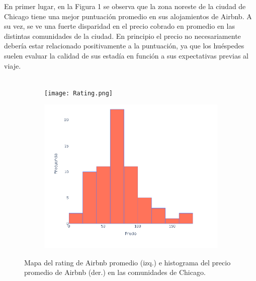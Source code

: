 \documentclass[10.5pt]{article}   %
\begin{document}
En primer lugar, en la Figura 1 se observa que la zona noreste de la ciudad de Chicago tiene una mejor puntuación promedio en sus alojamientos de Airbnb. A su vez, se ve una fuerte disparidad en el precio cobrado en promedio en las distintas comunidades de la ciudad. En principio el precio no necesariamente debería estar relacionado positivamente a la puntuación, ya que los huéspedes suelen evaluar la calidad de sus estadía en función a sus expectativas previas al viaje. \\\

\begin{figure}[H]
\centering
\begin{subfigure}{.5\textwidth}
    \centering
     \textbf{}\par\medskip
    \texttt{[image: Rating.png]}
    \label{fig2}
\end{subfigure}%
\begin{subfigure}{0.65\textwidth}
    \centering
     \textbf{}\par\medskip
    \includegraphics[scale=0.6]{Price.png}
    \label{fig2}
\end{subfigure}%
\caption{Mapa del rating de Airbnb promedio (izq.) e histograma del precio promedio de Airbnb (der.) en las comunidades de Chicago.}
\end{figure}
\end{document}
